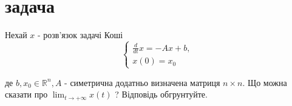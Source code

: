 
\section{задача}
\begin{tcolorbox}[title=Умова]
Нехай $x$ - розв'язок задачі Коші
$$
\left\{\begin{array}{l}
\frac{d}{d t} x=-A x+b, \\
x(0)=x_0
\end{array}\right.
$$

де $b, x_0 \in \mathbb{R}^n, A$ - симетрична додатньо визначена матриця $n \times n$. Що можна сказати про $\lim _{t \rightarrow+\infty} x(t)$ ? Відповідь обгрунтуйте.

\end{tcolorbox}
